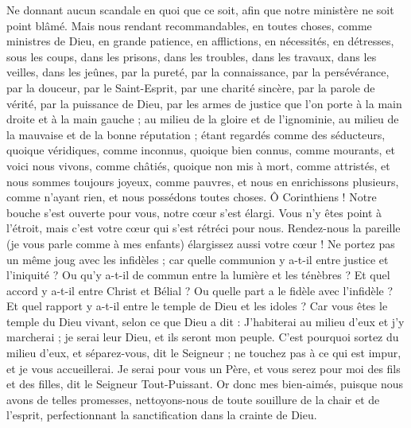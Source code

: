 \begin{multicols}{2}
Ne donnant aucun scandale en quoi que ce soit, afin que notre ministère ne soit point blâmé.
Mais nous rendant recommandables, en toutes choses, comme ministres de Dieu, en grande patience, en afflictions, en nécessités, en détresses,
sous les coups, dans les prisons, dans les troubles, dans les travaux, dans les veilles, dans les jeûnes,
par la pureté, par la connaissance, par la persévérance, par la douceur, par le Saint-Esprit, par une charité sincère,
par la parole de vérité, par la puissance de Dieu, par les armes de justice que l'on porte à la main droite et à la main gauche ;
au milieu de la gloire et de l'ignominie, au milieu de la mauvaise et de la bonne réputation ; étant regardés comme des séducteurs, quoique véridiques,
comme inconnus, quoique bien connus, comme mourants, et voici nous vivons, comme châtiés, quoique non mis à mort,
comme attristés, et nous sommes toujours joyeux, comme pauvres, et nous en enrichissons plusieurs, comme n'ayant rien, et nous possédons toutes choses.
Ô Corinthiens ! Notre bouche s’est ouverte pour vous, notre cœur s'est élargi.
Vous n’y êtes point à l'étroit, mais c’est votre cœur qui s’est rétréci pour nous.
Rendez-nous la pareille (je vous parle comme à mes enfants) élargissez aussi votre cœur !
Ne portez pas un même joug avec les infidèles ; car quelle communion y a-t-il entre justice et l'iniquité ? Ou qu’y a-t-il de commun entre la lumière et les ténèbres ?
Et quel accord y a-t-il entre Christ et Bélial ? Ou quelle part a le fidèle avec l'infidèle ?
Et quel rapport y a-t-il entre le temple de Dieu et les idoles ? Car vous êtes le temple du Dieu vivant, selon ce que Dieu a dit : J'habiterai au milieu d'eux et j'y marcherai ; je serai leur Dieu, et ils seront mon peuple.
C'est pourquoi sortez du milieu d'eux, et séparez-vous, dit le Seigneur ; ne touchez pas à ce qui est impur, et je vous accueillerai.
Je serai pour vous un Père, et vous serez pour moi des fils et des filles, dit le Seigneur Tout-Puissant.
\VerseOne{}Or donc mes bien-aimés, puisque nous avons de telles promesses, nettoyons-nous de toute souillure de la chair et de l'esprit, perfectionnant la sanctification dans la crainte de Dieu.

\end{multicols}
